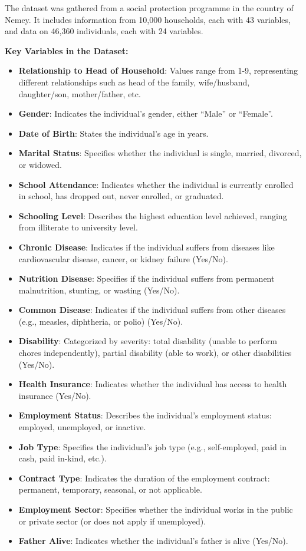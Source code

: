 \documentclass[
]{article}
\begin{document}
The dataset was gathered from a social protection programme in the
country of Nemey. It includes information from 10,000 households, each
with 43 variables, and data on 46,360 individuals, each with 24
variables.

\textbf{Key Variables in the Dataset:}

\begin{itemize}
\item
  \textbf{Relationship to Head of Household}: Values range from 1-9,
  representing different relationships such as head of the family,
  wife/husband, daughter/son, mother/father, etc.
\item
  \textbf{Gender}: Indicates the individual's gender, either ``Male'' or
  ``Female''.
\item
  \textbf{Date of Birth}: States the individual's age in years.
\item
  \textbf{Marital Status}: Specifies whether the individual is single,
  married, divorced, or widowed.
\item
  \textbf{School Attendance}: Indicates whether the individual is
  currently enrolled in school, has dropped out, never enrolled, or
  graduated.
\item
  \textbf{Schooling Level}: Describes the highest education level
  achieved, ranging from illiterate to university level.
\item
  \textbf{Chronic Disease}: Indicates if the individual suffers from
  diseases like cardiovascular disease, cancer, or kidney failure
  (Yes/No).
\item
  \textbf{Nutrition Disease}: Specifies if the individual suffers from
  permanent malnutrition, stunting, or wasting (Yes/No).
\item
  \textbf{Common Disease}: Indicates if the individual suffers from
  other diseases (e.g., measles, diphtheria, or polio) (Yes/No).
\item
  \textbf{Disability}: Categorized by severity: total disability (unable
  to perform chores independently), partial disability (able to work),
  or other disabilities (Yes/No).
\item
  \textbf{Health Insurance}: Indicates whether the individual has access
  to health insurance (Yes/No).
\item
  \textbf{Employment Status}: Describes the individual's employment
  status: employed, unemployed, or inactive.
\item
  \textbf{Job Type}: Specifies the individual's job type (e.g.,
  self-employed, paid in cash, paid in-kind, etc.).
\item
  \textbf{Contract Type}: Indicates the duration of the employment
  contract: permanent, temporary, seasonal, or not applicable.
\item
  \textbf{Employment Sector}: Specifies whether the individual works in
  the public or private sector (or does not apply if unemployed).
\item
  \textbf{Father Alive}: Indicates whether the individual's father is
  alive (Yes/No).
\end{itemize}
\end{document}
